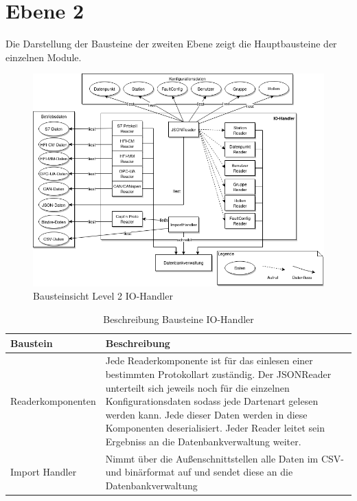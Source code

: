 \section{Ebene 2}
Die Darstellung der Bausteine der zweiten Ebene zeigt die Hauptbausteine der einzelnen Module.
\begin{figure}[h]
	\centering
	\includegraphics[width=1\textwidth]{Graphics/bausteinansicht_ebene_2_IO-Modul.png}
	\caption{Bausteinsicht Level 2 IO-Handler}
	\label{fig:bausteinsichtlvl2_modulIO}
\end{figure}                 

\begin{table}[t]
	\begin{tabularx}{\textwidth}{|p{5cm}| X|}
		\hline
		Baustein & Beschreibung\\
		\hline
		Readerkomponenten & Jede Readerkomponente ist für das einlesen einer bestimmten Protokollart zuständig. Der JSONReader unterteilt sich jeweils noch für die einzelnen Konfigurationsdaten sodass jede Dartenart gelesen werden kann. Jede dieser Daten werden in diese Komponenten deserialisiert. Jeder Reader leitet sein Ergebniss an die Datenbankverwaltung weiter. \\
		\hline
		Import Handler &  Nimmt über die Außenschnittstellen alle Daten im CSV- und binärformat auf und sendet diese an die Datenbankverwaltung\\
		\hline
	\end{tabularx} 
	\caption{Beschreibung Bausteine IO-Handler}	\label{tab:IOHandlerBeschreibung}
\end{table}

